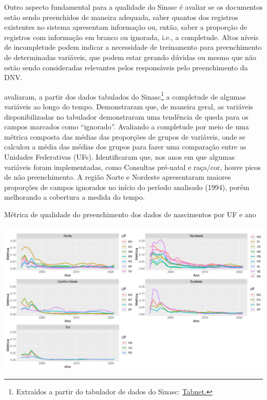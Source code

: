 Outro aspecto fundamental para a qualidade do Sinasc é avaliar se os documentos estão sendo preenchidos de maneira adequada, saber quantos dos registros existentes no sistema apresentam informação
ou, então, saber a proporção de registros com informação em branco ou ignorada, i.e., a completude. Altos níveis de incompletude podem indicar a necessidade de treinamento para preenchimento de determinadas variáveis, que podem estar gerando dúvidas ou mesmo que não estão sendo consideradas relevantes pelos responsáveis pelo preenchimento da DNV.  

 avaliaram, a partir dos dados tabulados do Sinasc\footnote{Extraídos a partir do tabulador de dados do Sinasc: \href{https://datasus.saude.gov.br/informacoes-de-saude-tabnet/}{Tabnet.}} a completude de algumas variáveis ao longo do tempo. Demonstraram que, de maneira geral, as variáveis disponibilizadas no tabulador demonstraram uma tendência de queda para os campos marcados como “ignorado”. Avaliando a completude por meio de uma métrica composta das médias das proporções de grupos de variáveis, onde se calculou a média das médias dos grupos para fazer uma comparação entre as Unidades Federativas (UFs). Identificaram que, nos anos em que algumas variáveis foram implementadas, como Consultas pré-natal e raça/cor, houve picos de não preenchimento. A região Norte e Nordeste apresentaram maiores proporções de campos ignorados no início do período analisado (1994), porém melhorando a cobertura a medida do tempo. 

\begin{grafico}
    \centering
     \caption{Métrica de qualidade do preenchimento dos dados de nascimentos por UF e ano}
    \includegraphics[width=6in]{imagens/o-que-se-tem.PNG}
\end{grafico}


